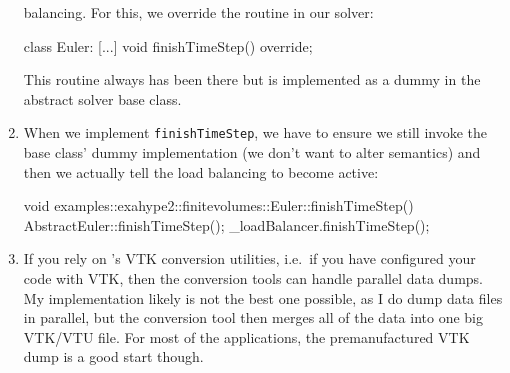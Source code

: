 \begin{enumerate}
  balancing. For this, we override the routine in our solver:
  \begin{code}
class Euler: [...]
    void finishTimeStep() override;
  \end{code}
  This routine always has been there but is implemented as a dummy in the
  abstract solver base class.
  \item When we implement \texttt{finishTimeStep}, we have to ensure we still
  invoke the base class' dummy implementation (we don't want to alter semantics)
  and then we actually tell the load balancing to become active:
  \begin{code}
void examples::exahype2::finitevolumes::Euler::finishTimeStep() {
  AbstractEuler::finishTimeStep();
  _loadBalancer.finishTimeStep();
}
  \end{code}
  \item If you rely on \Peano's VTK conversion utilities, i.e.~if you have
  configured your code with VTK, then the conversion tools can handle parallel
  data dumps. My implementation likely is not the best one possible, as I do
  dump data files in parallel, but the conversion tool then merges all of the
  data into one big VTK/VTU file. For most of the applications, the
  premanufactured VTK dump is a good start though.
\end{enumerate}

